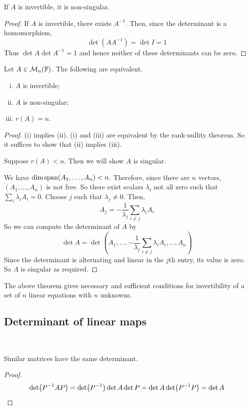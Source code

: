 \documentclass[a4paper]{article}
\begin{document}
\begin{lemma}
	If $ A $ is invertible, it is non-singular.
\end{lemma}
\begin{proof}
	If $ A $ is invertible, there exists $ A^{-1} $.
	Then, since the determinant is a homomorphism,
	\[
		\det(A A^{-1}) = \det I = 1
	\]
	Thus $ \det A \det A^{-1} = 1 $ and hence neither of these determinants can be zero.
\end{proof}
\begin{theorem}
	Let $ A \in {\mathcal{M}}_n({\mathbb{F}}) $.
	The following are equivalent.
	\begin{enumerate}[(i)]
		\item $ A $ is invertible;
		\item $ A $ is non-singular;
		\item $ r(A) = n $.
	\end{enumerate}
\end{theorem}
\begin{proof}
	(i) implies (ii).
	(i) and (iii) are equivalent by the rank-nullity theorem.
	So it suffices to show that (ii) implies (iii).

	Suppose $ r(A) < n $.
	Then we will show $ A $ is singular.
	
	We have $ \dim \operatorname{span}(A_1, \dots, A_n) < n $.
	Therefore, since there are $ n $ vectors, $ (A_1, \dots, A_n) $ is not free.
	So there exist scalars $ \lambda_i $ not all zero such that $ \sum_i \lambda_i A_i = 0 $.
	Choose $ j $ such that $ \lambda_j \neq 0 $.
	Then,
	\[
		A_j = -\frac{1}{\lambda_j} \sum_{i \neq j} \lambda_i A_i
	\]
	So we can compute the determinant of $ A $ by
	\[
		\det A = \det(A_1, \dots, -\frac{1}{\lambda_j} \sum_{i \neq j} \lambda_i A_i, \dots, A_n)
	\]
	Since the determinant is alternating and linear in the $ j $th entry, its value is zero.
	So $ A $ is singular as required.
\end{proof}

\begin{remark}
	The above theorem gives necessary and sufficient conditions for invertibility of a set of $ n $ linear equations with $ n $ unknowns.
\end{remark}

\subsection{Determinant of linear maps}\ \vspace{-1.5em}

\begin{lemma}
	Similar matrices have the same determinant.
\end{lemma}
\begin{proof}
	\[
		\det (P^{-1} A P) = \det(P^{-1}) \det A \det P = \det A \det (P^{-1} P) = \det A\qedhere
	\]
\end{proof}
\end{document}
